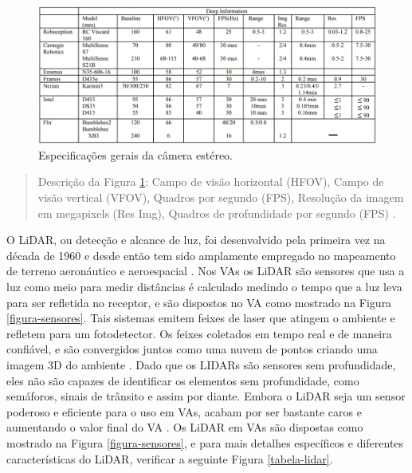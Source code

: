 \begin{figure}[H]
\centering
\includegraphics[width=\textwidth]{Figures/camera-table.png}
\caption{Especificações gerais da câmera estéreo.}
\label{tabela-camera}
\end{figure}
\begin{quote}
Descrição da Figura \ref{tabela-camera}: Campo de visão horizontal (HFOV), Campo de visão vertical (VFOV), Quadros por segundo (FPS), Resolução da imagem em megapixels (Res Img), Quadros de profundidade por segundo (FPS) \cite{sensors}.
\end{quote}

O LiDAR, ou detecção e alcance de luz, foi desenvolvido pela primeira vez na década de 1960 e desde então tem sido amplamente empregado no mapeamento de terreno aeronáutico e aeroespacial \cite{sensors}. Nos VAs os LiDAR são sensores que usa a luz como meio para medir distâncias é calculado medindo o tempo que a luz leva para ser refletida no receptor, e são dispostos no VA como mostrado na Figura \ref{figura-sensores}. Tais sistemas emitem feixes de laser que atingem o ambiente e refletem para um fotodetector. Os feixes coletados em tempo real e de maneira confiável, e  são convergidos juntos como uma nuvem de pontos criando uma imagem 3D do ambiente \cite{aplicacao2}. Dado que os LIDARs são sensores sem profundidade, eles não são capazes de identificar os elementos sem profundidade, como semáforos, sinais de trânsito e assim por diante.
Embora o LiDAR seja um sensor poderoso e eficiente para o uso em VAs, acabam por ser  bastante caros e aumentando o valor final do VA \cite{review-auto}. 
Os LiDAR em VAs são dispostas como mostrado na Figura \ref{figura-sensores}, e para mais detalhes específicos e diferentes características do LiDAR, verificar a seguinte Figura \ref{tabela-lidar}.

